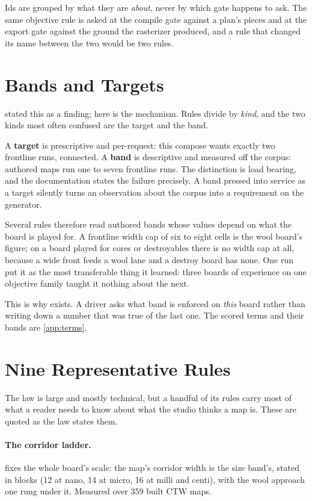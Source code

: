 Ids are grouped by what they are \emph{about}, never by which gate happens to ask.
The same objective rule is asked at the compile gate against a plan's pieces and
at the export gate against the ground the rasterizer produced, and a rule that
changed its name between the two would be two rules.

\section{Bands and Targets}

 stated this as a finding; here is the mechanism. Rules divide
by \emph{kind}, and the two kinds most often confused are the target and the band.

A \textbf{target} is prescriptive and per-request: this compose wants exactly two
frontline runs, connected. A \textbf{band} is descriptive and measured off the
corpus: authored maps run one to seven frontline runs. The distinction is load
bearing, and the documentation states the failure precisely. A band pressed into
service as a target silently turns an observation about the corpus into a
requirement on the generator.

Several rules therefore read authored bands whose values depend on what the board
is played for. A frontline width cap of six to eight cells is the wool board's
figure; on a board played for cores or destroyables there is no width cap at all,
because a wide front feeds a wool lane and a destroy board has none. One run put
it as the most transferable thing it learned: three boards of experience on one
objective family taught it nothing about the next.

This is why  exists. A driver asks what band is
enforced on \emph{this} board rather than writing down a number that was true of
the last one. The \ScoredTermCount{} scored terms and their bands are \cref{app:terms}.

\section{Nine Representative Rules}

The law is large and mostly technical, but a handful of its rules carry most of
what a reader needs to know about what the studio thinks a map is. These are
quoted as the law states them.

\paragraph{The corridor ladder.}  fixes the whole board's scale:
the map's corridor width is the size band's, stated in blocks (12 at nano, 14 at
micro, 16 at milli and centi), with the wool approach one rung under it.
Measured over 359 built CTW maps.

